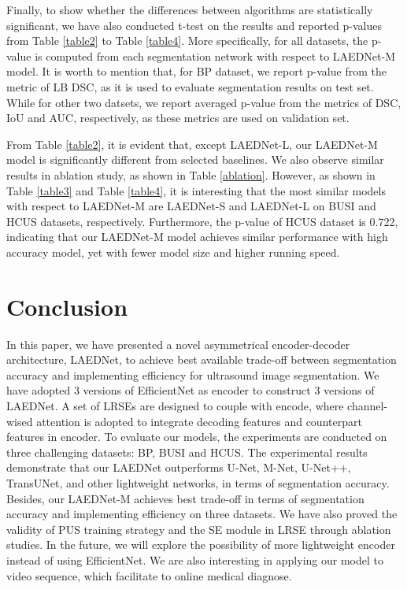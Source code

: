 \documentclass[review]{elsarticle}
\begin{document}
Finally, to show whether the differences between algorithms are statistically significant, we have also conducted t-test on the results and reported p-values from Table \ref{table2} to Table \ref{table4}. More specifically, for all datasets, the p-value is computed from each segmentation network with respect to LAEDNet-M model. It is worth to mention that, for BP dataset, we report p-value from the metric of LB DSC, as it is used to evaluate segmentation results on test set. While for other two datsets, we report averaged p-value from the metrics of DSC, IoU and AUC, respectively, as these metrics are used on validation set.

From Table \ref{table2}, it is evident that, except LAEDNet-L, our LAEDNet-M model is significantly different from selected baselines. We also observe similar results in ablation study, as shown in Table \ref{ablation}. However, as shown in Table \ref{table3} and Table \ref{table4}, it is interesting that the most similar models with respect to LAEDNet-M are LAEDNet-S and LAEDNet-L on BUSI and HCUS datasets, respectively. Furthermore, the p-value of HCUS dataset is 0.722, indicating that our LAEDNet-M model achieves similar performance with high accuracy model, yet with fewer model size and higher running speed.

\section{Conclusion}

In this paper, we have presented a novel asymmetrical encoder-decoder architecture, LAEDNet, to achieve best available trade-off between segmentation accuracy and implementing efficiency for ultrasound image segmentation. We have adopted 3 versions of EfficientNet as encoder to construct 3 versions of LAEDNet. A set of LRSEs are designed to couple with encode, where channel-wised attention is adopted to integrate decoding features and counterpart features in encoder. To evaluate our models, the experiments are conducted on three challenging datasets: BP\cite{Kaggle}, BUSI\cite{2019Dataset} and HCUS\cite{2018Automated}. The experimental results demonstrate that our LAEDNet outperforms U-Net\cite{2015U}, M-Net\cite{2018Joint}, U-Net++\cite{2020UNet}, TransUNet\cite{chen2021transunet}, and other lightweight networks\cite{2019Nas-unet,2020breastmass}, in terms of segmentation accuracy. Besides, our LAEDNet-M achieves best trade-off in terms of segmentation accuracy and implementing efficiency on three datasets. We have also proved the validity of PUS training strategy and the SE module in LRSE through ablation studies. In the future, we will explore the possibility of more lightweight encoder instead of using EfficientNet. We are also interesting in applying our model to video sequence, which facilitate to online medical diagnose.
\end{document}
